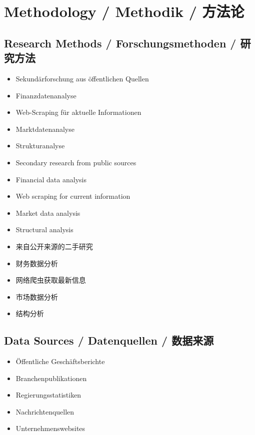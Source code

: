 \chapter{Methodology / Methodik / 方法论}

\section{Research Methods / Forschungsmethoden / 研究方法}

\begin{otherlanguage}{ngerman}
\begin{itemize}
    \item Sekundärforschung aus öffentlichen Quellen
    \item Finanzdatenanalyse
    \item Web-Scraping für aktuelle Informationen
    \item Marktdatenanalyse
    \item Strukturanalyse
\end{itemize}
\end{otherlanguage}

\begin{itemize}
    \item Secondary research from public sources
    \item Financial data analysis
    \item Web scraping for current information
    \item Market data analysis
    \item Structural analysis
\end{itemize}

\begin{itemize}
    \item 来自公开来源的二手研究
    \item 财务数据分析
    \item 网络爬虫获取最新信息
    \item 市场数据分析
    \item 结构分析
\end{itemize}

\section{Data Sources / Datenquellen / 数据来源}

\begin{otherlanguage}{ngerman}
\begin{itemize}
    \item Öffentliche Geschäftsberichte
    \item Branchenpublikationen
    \item Regierungsstatistiken
    \item Nachrichtenquellen
    \item Unternehmenswebsites
\end{itemize}
\end{otherlanguage}

